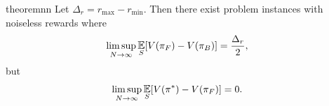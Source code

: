 




\begin{restatable}{theorem}{nn}\label{thm:nn}
Let $ \Delta_r = r_{\mathrm{max}} - r_{\mathrm{min}}$.
Then there exist problem instances with noiseless rewards where
\begin{align*}
    \limsup_{N\to \infty} \E_S[V(\pi_F) - V(\pi_B)] &=  \frac{\Delta_r}{2},%
\end{align*}
but
\begin{align*}
    \limsup_{N\to \infty} \E_S[V(\pi^*) - V(\pi_F)] &= 0.
\end{align*}
\end{restatable}

